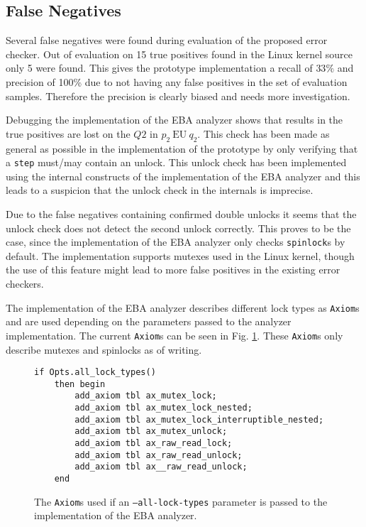 \subsection{False Negatives}

Several false negatives were found during evaluation of the proposed error checker. Out of evaluation on 15 true positives found in the Linux kernel source only 5 were found. This gives the prototype implementation a recall of $33\%$ and precision of 100\% due to not having any false positives in the set of evaluation samples. Therefore the precision is clearly biased and needs more investigation. 

\newpar Debugging the implementation of the EBA analyzer shows that results in the true positives are lost on the $Q2$ in $p_2\:\mathrm{EU}\:q_2$. This check has been made as general as possible in the implementation of the prototype by only verifying that a \texttt{step} must/may contain an unlock. This unlock check has been implemented using the internal constructs of the implementation of the EBA analyzer and this leads to a suspicion that the unlock check in the internals is imprecise. 

\newpar Due to the false negatives containing confirmed double unlocks it seems that the unlock check does not detect the second unlock correctly. This proves to be the case, since the implementation of the EBA analyzer only checks \texttt{spinlock}s by default. The implementation supports mutexes used in the Linux kernel, though the use of this feature might lead to more false positives in the existing error checkers. 

\newpar The implementation of the EBA analyzer describes different lock types as \texttt{Axiom}s and are used depending on the parameters passed to the analyzer implementation. The current \texttt{Axiom}s can be seen in Fig. \ref{axioms}. These \texttt{Axiom}s only describe mutexes and spinlocks as of writing. 

\begin{figure}[H]
\centering
\begin{verbatim}
if Opts.all_lock_types()
    then begin
        add_axiom tbl ax_mutex_lock;
        add_axiom tbl ax_mutex_lock_nested;
        add_axiom tbl ax_mutex_lock_interruptible_nested;
        add_axiom tbl ax_mutex_unlock;
        add_axiom tbl ax_raw_read_lock;
        add_axiom tbl ax_raw_read_unlock;
        add_axiom tbl ax__raw_read_unlock;
    end
\end{verbatim}
\caption{The \texttt{Axiom}s used if an \texttt{--all-lock-types} parameter is passed to the implementation of the EBA analyzer.}
\label{axioms}
\end{figure}

